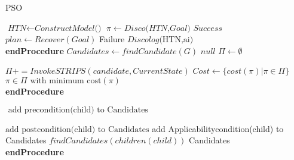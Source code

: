 \documentclass{article}
\begin{document}
\begin{algorithm}
\caption{PSO}
\label{pseudoPSO}
\begin{algorithmic}[1]
				\State $\textit{HTN} \gets\textit{ConstructModel()} $
				\State $\pi \gets Disco \textit{(HTN,Goal)}$
				\State \Return $\textit{Success} $
				\Else 
				\State$ plan \gets Recover(Goal)$
				\State \Return Failure
				\Else 
				\State  $\textit{Discolog} \text{(HTN,ai)}$
				\EndFor
				\EndIf
				\EndIf
				\\
				\EndProcedure \textbf{endProcedure}
				\State 
				\State $\textit{Candidates}\gets\textit{findCandidate}{(G)} $
				\State \Return $\textit{null} $
				\Else 
				\State $\Pi \gets \emptyset$
				
				\State $\Pi += InvokeSTRIPS(candidate,CurrentState)$
				\State  $Cost \gets \{ cost(\pi) | \pi \in  \Pi \} $
				\EndFor
				\EndIf
				\State \Return $\pi \in \Pi \text{ with minimum cost}(\pi)$
				\\
				\EndProcedure \textbf{endProcedure}
				
				\State 
				
				\State $  \text{ add precondition(child) to Candidates}$
				
				\State $\text{add postcondition(child) to Candidates}$
				\EndIf
				\State add Applicabilitycondition(child) to Candidates
				\EndIf
				\State $\textit{findCandidates} (children(child))$
				\EndFor
				\State \Return Candidates
				\\
				\EndProcedure \textbf{endProcedure}
\end{algorithmic}
\end{algorithm}
\end{document}
